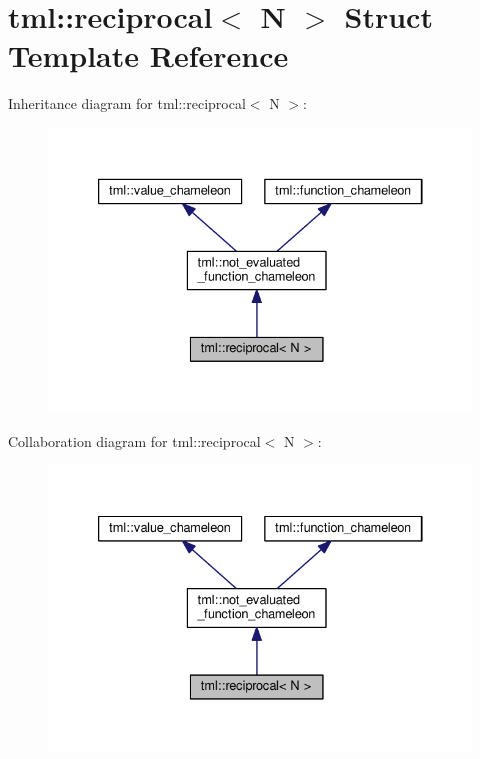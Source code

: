 \hypertarget{structtml_1_1reciprocal}{\section{tml\+:\+:reciprocal$<$ N $>$ Struct Template Reference}
\label{structtml_1_1reciprocal}
}


Inheritance diagram for tml\+:\+:reciprocal$<$ N $>$\+:
\nopagebreak
\begin{figure}[H]
\begin{center}
\leavevmode
\includegraphics[width=333pt]{structtml_1_1reciprocal__inherit__graph}
\end{center}
\end{figure}


Collaboration diagram for tml\+:\+:reciprocal$<$ N $>$\+:
\nopagebreak
\begin{figure}[H]
\begin{center}
\leavevmode
\includegraphics[width=333pt]{structtml_1_1reciprocal__coll__graph}
\end{center}
\end{figure}
